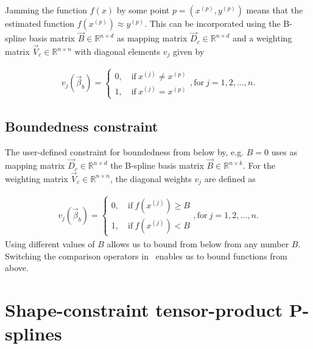 Jamming the function $f(x)$ by some point $p = (x^{(p)}, y^{(p)})$ means that the estimated function $f(x^{(p)}) \approx y^{(p)}$. This can be incorporated using the B-spline basis matrix $\vec{B} \in \mathbb{R}^{n \times d}$ as mapping matrix $\vec{D}_c \in \mathbb{R}^{n \times d}$ and a weighting matrix $\vec{V}_c \in \mathbb{R}^{n \times n}$ with diagonal elements $v_j$ given by

\begin{align} \label{eq:v_jamming}
	v_j(\vec{\beta}_b) = 
	\begin{cases}
		0, \quad \text{if} \ x^{(j)} \ne x^{(p)} \\
		1, \quad \text{if} \ x^{(j)} = x^{(p)} 
	\end{cases}, \text{for} \ j = 1,2,\dots,n.
\end{align} 

\subsection{Boundedness constraint} \label{subsec:BoudC}

The user-defined constraint for boundedness from below by, e.g. $B=0$ uses as mapping matrix $\vec{D}_c \in \mathbb{R}^{n \times d}$ the B-spline basis matrix $\vec{B} \in \mathbb{R}^{n \times k}$. For the weighting matrix $\vec{V}_c \in \mathbb{R}^{n\times n}$, the diagonal weights $v_j$ are defined as

\begin{align} \label{eq:v_boundedness}
	v_j(\vec{\beta}_b) = \begin{cases} 
		0, \quad \text{if} \ f(x^{(j)}) \ge B\\ 
		1, \quad \text{if} \ f(x^{(j)})  < B		
	\end{cases}, \text{for} \ j=1,2,\dots,n.
\end{align}
%
Using different values of $B$ allows us to bound from below from any number $B$. Switching the comparison operators in~ enables us to bound functions from above. 


\section{Shape-constraint tensor-product P-splines}\label{sec:SCP-tp-splines}

